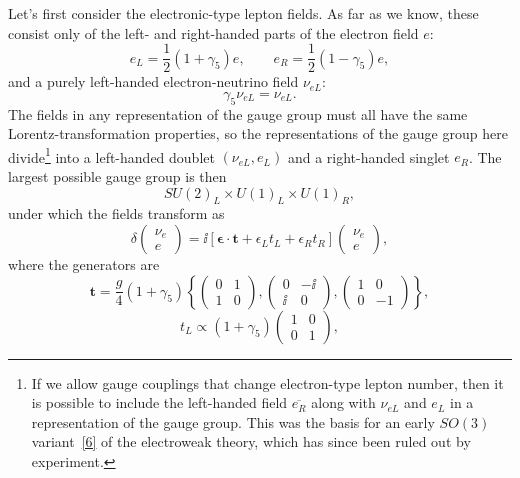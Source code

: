 Let's first consider the electronic-type lepton fields. As far as we know, these consist only of the left- and right-handed parts of the electron field $e$:
\begin{equation}
e_L=\frac{1}{2}(1+\gamma_5)e,
\qquad
e_R=\frac{1}{2}(1-\gamma_5)e,
\tag{21.3.1}\label{eq:21.3.1}
\end{equation}
and a purely left-handed electron-neutrino field $\nu_{eL}$:
\begin{equation}
\gamma_5\nu_{eL}=\nu_{eL}.
\tag{21.3.2}\label{eq:21.3.2}
\end{equation}
The fields in any representation of the gauge group must all have the same Lorentz-transformation properties, so the representations of the gauge group here divide\footnote{If we allow gauge couplings that change electron-type lepton number, then it is possible to include the left-handed field $\overline{e_R}$ along with $\nu_{eL}$ and $e_L$ in a representation of the gauge group. This was the basis for an early $SO(3)$ variant~\hyperref[ch21-ref-6]{[6]} of the electroweak theory, which has since been ruled out by experiment.} into a left-handed doublet $(\nu_{eL},e_L)$ and a right-handed singlet $e_R$. The largest possible gauge group is then
\[
SU(2)_L\times U(1)_L\times U(1)_R,
\]
under which the fields transform as
\begin{equation}
\delta
\begin{pmatrix}
\nu_e\\ e
\end{pmatrix}
=\ii\left[\boldsymbol{\epsilon}\cdot\mathbf{t}+\epsilon_Lt_L+\epsilon_Rt_R\right]
\begin{pmatrix}
\nu_e\\ e
\end{pmatrix},
\tag{21.3.3}\label{eq:21.3.3}
\end{equation}
where the generators are
\begin{equation}
\mathbf{t}
=\frac{g}{4}(1+\gamma_5)
\left\{
\begin{pmatrix}0&1\\1&0\end{pmatrix},
\begin{pmatrix}0&-\ii\\\ii&0\end{pmatrix},
\begin{pmatrix}1&0\\0&-1\end{pmatrix}
\right\},
\tag{21.3.4}\label{eq:21.3.4}
\end{equation}
\begin{equation}
t_L\propto(1+\gamma_5)
\begin{pmatrix}1&0\\0&1\end{pmatrix},
\tag{21.3.5}\label{eq:21.3.5}
\end{equation}
